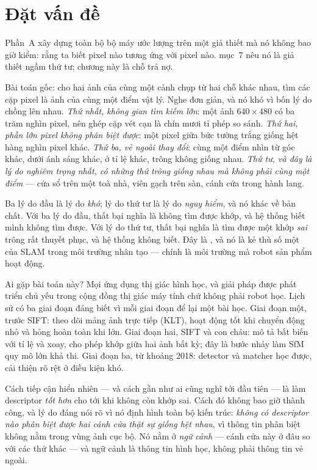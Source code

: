 \documentclass[../../vslam.tex]{subfiles}
\begin{document}
\section{Đặt vấn đề}

Phần~A xây dựng toàn bộ bộ máy ước lượng trên một giả thiết mà nó không bao giờ kiểm: rằng ta biết pixel nào tương ứng với pixel nào.  mục~7 nêu nó là giả thiết ngầm thứ tư; chương này là chỗ trả nợ.

Bài toán gốc: cho hai ảnh của cùng một cảnh chụp từ hai chỗ khác nhau, tìm các cặp pixel là ảnh của cùng một điểm vật lý. Nghe đơn giản, và nó khó vì bốn lý do chồng lên nhau. \emph{Thứ nhất, không gian tìm kiếm lớn}: một ảnh \(640\times480\) có ba trăm nghìn pixel, nên ghép cặp vét cạn là chín mươi tỉ phép so sánh. \emph{Thứ hai, phần lớn pixel không phân biệt được}: một pixel giữa bức tường trắng giống hệt hàng nghìn pixel khác. \emph{Thứ ba, vẻ ngoài thay đổi}: cùng một điểm nhìn từ góc khác, dưới ánh sáng khác, ở tỉ lệ khác, trông không giống nhau. \emph{Thứ tư, và đây là lý do nghiêm trọng nhất, có những thứ trông giống nhau mà không phải cùng một điểm} --- cửa sổ trên một toà nhà, viên gạch trên sàn, cánh cửa trong hành lang.

Ba lý do đầu là lý do \emph{khó}; lý do thứ tư là lý do \emph{nguy hiểm}, và nó khác về bản chất. Với ba lý do đầu, thất bại nghĩa là không tìm được khớp, và hệ thống biết mình không tìm được. Với lý do thứ tư, thất bại nghĩa là tìm được một khớp \emph{sai} trông rất thuyết phục, và hệ thống không biết. Đây là , và nó là kẻ thù số một của SLAM trong môi trường nhân tạo --- chính là môi trường mà robot sản phẩm hoạt động.

Ai gặp bài toán này? Mọi ứng dụng thị giác hình học, và giải pháp được phát triển chủ yếu trong cộng đồng thị giác máy tính chứ không phải robot học. Lịch sử có ba giai đoạn đáng biết vì mỗi giai đoạn để lại một bài học. Giai đoạn một, trước SIFT: theo dõi mảng ảnh trực tiếp (KLT), hoạt động tốt khi chuyển động nhỏ và hỏng hoàn toàn khi lớn. Giai đoạn hai, SIFT \cite{lowe2004sift} và con cháu: mô tả bất biến với tỉ lệ và xoay, cho phép khớp giữa hai ảnh bất kỳ; đây là bước nhảy làm SfM quy mô lớn khả thi. Giai đoạn ba, từ khoảng 2018: detector và matcher học được, cải thiện rõ rệt ở điều kiện khó.

Cách tiếp cận hiển nhiên --- và cách gần như ai cũng nghĩ tới đầu tiên --- là làm descriptor \emph{tốt hơn} cho tới khi không còn khớp sai. Cách đó không bao giờ thành công, và lý do đáng nói rõ vì nó định hình toàn bộ kiến trúc: \emph{không có descriptor nào phân biệt được hai cánh cửa thật sự giống hệt nhau}, vì thông tin phân biệt không nằm trong vùng ảnh cục bộ. Nó nằm ở \emph{ngữ cảnh} --- cánh cửa này ở đâu so với các thứ khác --- và ngữ cảnh là thông tin hình học, không phải thông tin vẻ ngoài.
\end{document}

